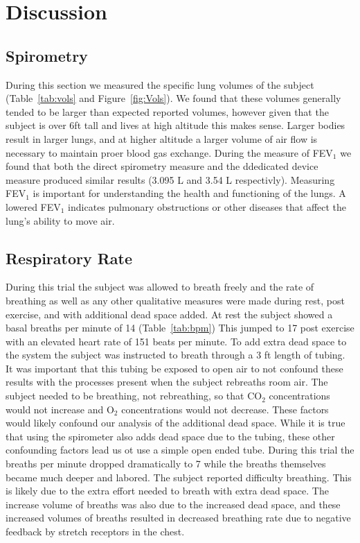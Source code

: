 \documentclass[12pt]{article}
\newcommand{\coo}{CO$_2$}
\newcommand{\oo}{O$_2$}
\begin{document}
\section{Discussion}

\subsection{Spirometry}
During this section we measured the specific lung volumes of the subject (Table~\ref{tab:vols} and Figure~\ref{fig:Vols}). We found that these volumes generally tended to be larger than expected reported volumes, however given that the subject is over 6ft tall and lives at high altitude this makes sense. Larger bodies result in larger lungs, and at higher altitude a larger volume of air flow is necessary to maintain proer blood gas exchange. During the  measure of FEV$_1$ we found that both the direct spirometry measure and the ddedicated device measure produced similar results (3.095 L and 3.54 L respectivly). Measuring FEV$_1$ is important for understanding the health and functioning of the lungs. A lowered FEV$_1$ indicates pulmonary obstructions or other diseases that affect the lung's ability to move air. 

\subsection{Respiratory Rate}
During this trial the subject was allowed to breath freely and the rate of breathing as well as any other qualitative measures were made during rest, post exercise, and with additional dead space added. At rest the subject showed a basal breaths per minute of 14 (Table~\ref{tab:bpm}) This jumped to 17 post exercise with an elevated heart rate of 151 beats per minute. To add extra dead space to the system the subject was instructed to breath through a 3 ft length of tubing. It was important that this tubing be exposed to open air to not confound these results with the processes present when the subject rebreaths room air. The subject needed to be breathing, not rebreathing, so that \coo{} concentrations would not increase and \oo{} concentrations would not decrease. These factors would likely confound our analysis of the additional dead space. While it is true that using the spirometer also adds dead space due to the tubing, these other confounding factors lead us ot use a simple open ended tube. During this trial the breaths per minute dropped dramatically  to 7 while the breaths themselves became much deeper and labored. The subject reported difficulty breathing. This is likely due to the extra effort needed to breath with extra dead space. The increase volume of breaths was also due to the increased dead space, and these increased volumes of breaths resulted in decreased breathing rate due to negative feedback by stretch receptors in the chest.
\end{document}
